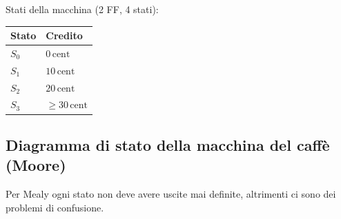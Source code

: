\documentclass[11pt,a4paper]{report}
\begin{document}
\noindent Stati della macchina (2 FF, 4 stati):

\begin{center}
\begin{tabular}{ll}
\toprule
Stato & Credito\\
\midrule
$S_0$ & $0\,\text{cent}$\\
$S_1$ & $10\,\text{cent}$\\
$S_2$ & $20\,\text{cent}$\\
$S_3$ & $\geq 30\,\text{cent}$\\
\bottomrule
\end{tabular}
\end{center}


\subsection{Diagramma di stato della macchina del caffè (Moore)}

\noindent Per Mealy ogni stato non deve avere uscite mai definite, altrimenti
ci sono dei problemi di confusione.
\end{document}
